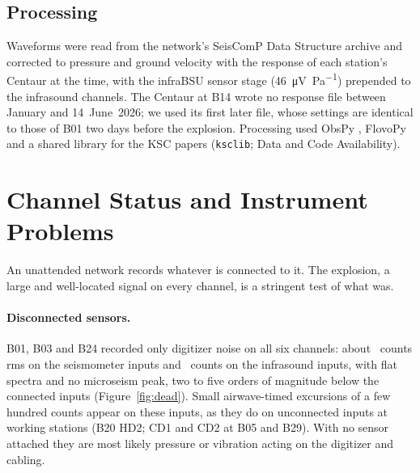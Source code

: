 \documentclass[]{seismica}
\newcommand{\supptab}[1]{Table~S#1}
\begin{document}
\begin{table}[htbp]
  \centering
  \caption{Stations, distances and azimuths from LC-36, and channel status
    for the explosion (coordinates in \supptab{1}, channel-by-channel status in \supptab{2}).}
  \label{tab:stations}
  \small
  
\end{table}

\subsection{Processing}

Waveforms were read from the network's SeisComP Data Structure archive
and corrected to pressure and ground velocity with the response of each
station's Centaur at the time, with the infraBSU sensor stage
(\SI{46}{\micro\volt\per\pascal}) prepended to the infrasound channels.
The Centaur at B14 wrote no response file between January and
14~June~2026; we used its first later file, whose settings are identical
to those of B01 two days before the explosion. Processing used ObsPy
\citep{Beyreuther2010,krischer_obspy_2015}, FlovoPy
\citep{flovopy_2026} and a shared library for the KSC papers
(\texttt{ksclib}; Data and Code Availability).

\section{Channel Status and Instrument Problems}
\label{sec:status}

An unattended network records whatever is connected to it. The
explosion, a large and well-located signal on every channel, is a
stringent test of what was.

\paragraph{Disconnected sensors.} B01, B03 and B24 recorded only
digitizer noise on all six channels: about \NGdeadDH~counts rms on the
seismometer inputs and \NGdeadDD~counts on the infrasound inputs, with flat
spectra and no microseism peak, two to five orders of magnitude below
the connected inputs (Figure~\ref{fig:dead}). Small airwave-timed
excursions of a few hundred counts appear on these inputs, as they do on
unconnected inputs at working stations (B20 HD2; CD1 and CD2 at B05 and
B29). With no sensor attached they are most likely pressure or vibration
acting on the digitizer and cabling.
\end{document}
